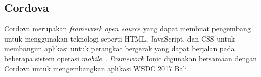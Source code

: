 \subsection{Cordova}
\label{subsec:cordova}
Cordova merupakan {\it framework open source} yang dapat membuat pengembang untuk menggunakan teknologi seperti HTML, JavaScript, dan CSS untuk membangun aplikasi untuk perangkat bergerak yang dapat berjalan pada beberapa sistem operasi {\it mobile}~\cite{gonsalves:18:evaluating}. {\it Framework} Ionic digunakan bersamaan dengan Cordova untuk mengembangkan aplikasi WSDC 2017 Bali. 

%



